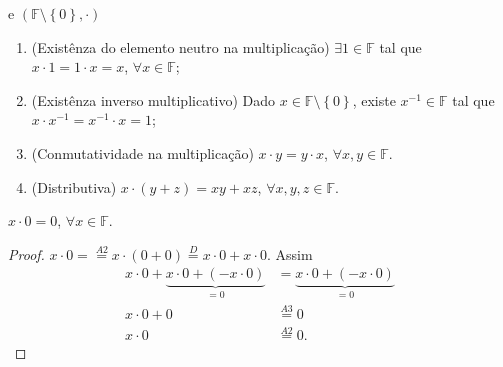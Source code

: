 \begin{definition}[Corpo]
	e $\left(\mathbb{F}\setminus\left\{0\right\},\cdot\right)$

	\begin{enumerate}[label={M\arabic*.},leftmargin=0em,itemindent=*]
		\item\label{multiplicação:1}

		      (Existênza do elemento neutro na multiplicação)
		      $\exists 1\in\mathbb{F}$ tal que $x\cdot 1=1\cdot x=x$, $\forall x\in\mathbb{F}$;

		\item\label{multiplicação:2}

		      (Existênza inverso multiplicativo)
		      Dado $x\in\mathbb{F}\setminus\left\{0\right\}$,
		      existe $x^{-1}\in\mathbb{F}$ tal que
		      $x\cdot x^{-1}=x^{-1}\cdot x=1$;

		\item\label{multiplicação:3}

		      (Conmutatividade na multiplicação)
		      $x\cdot y=y\cdot x$, $\forall x,y\in\mathbb{F}$.

		\item\label{multiplicação:4}

		      (Distributiva)
		      $x\cdot\left(y+z\right)=xy+xz$,
		      $\forall x,y,z\in\mathbb{F}$.
	\end{enumerate}
\end{definition}

\begin{proposition}
	$x\cdot0=0$, $\forall x\in\mathbb{F}$.
\end{proposition}

\begin{proof}
	\begin{math}
		x\cdot0=
		\overset{A2}{=}
		x\cdot\left(0+0\right)
		\overset{D}{=}
		x\cdot0+x\cdot0
	\end{math}.
	Assim
	\begin{align*}
		x\cdot0+
		\underbrace{x\cdot0+\left(-x\cdot0\right)}_{=0}
		        & =
		\underbrace{x\cdot0+\left(-x\cdot0\right)}_{=0} \\
		x\cdot0+
		0       & \overset{A3}{=}
		0                                               \\
		x\cdot0 & \overset{A2}{=}
		0.
	\end{align*}
\end{proof}

